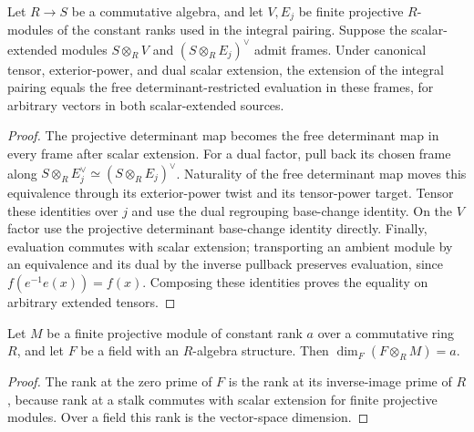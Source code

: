 \begin{lemma}
\label{lem:canonical-pairing-base-change}
\leanok
{}
Let $R\to S$ be a commutative algebra, and let $V,E_j$ be finite
projective $R$-modules of the constant ranks used in the integral
pairing. Suppose the scalar-extended modules $S\otimes_R V$ and
$(S\otimes_R E_j)^\vee$ admit frames. Under canonical tensor,
exterior-power, and dual scalar extension, the extension of the
integral pairing equals the free determinant-restricted evaluation
in these frames, for arbitrary vectors in both scalar-extended sources.
\end{lemma}
\begin{proof}
The projective determinant map becomes the free determinant map
in every frame after scalar extension. For a dual factor, pull back
its chosen frame along
$S\otimes_R E_j^\vee\simeq(S\otimes_R E_j)^\vee$.
Naturality of the free determinant map moves this equivalence
through its exterior-power twist and its tensor-power target.
Tensor these identities over $j$ and use the dual regrouping
base-change identity. On the $V$ factor use the projective
determinant base-change identity directly. Finally, evaluation
commutes with scalar extension; transporting an ambient module
by an equivalence and its dual by the inverse pullback preserves
evaluation, since $f(e^{-1}e(x))=f(x)$. Composing these identities
proves the equality on arbitrary extended tensors.
\end{proof}

\begin{lemma}
\label{lem:projective-fiber-frames}
\leanok
Let $M$ be a finite projective module of constant rank $a$ over a
commutative ring $R$, and let $F$ be a field with an $R$-algebra structure.
Then $\dim_F(F\otimes_R M)=a$.
\end{lemma}
\begin{proof}
The rank at the zero prime of $F$ is the rank at its inverse-image
prime of $R$, because rank at a stalk commutes with scalar extension
for finite projective modules. Over a field this rank is the vector-space
dimension.
\end{proof}

